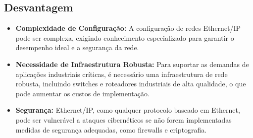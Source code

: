 \documentclass[a4paper,11pt]{article} %
\begin{document}
\subsection{Desvantagem}
\begin{itemize}
    \item \textbf{Complexidade de Configuração:} A configuração de redes Ethernet/IP pode ser complexa, exigindo conhecimento especializado para garantir o desempenho ideal e a segurança da rede.
    \item \textbf{Necessidade de Infraestrutura Robusta:} Para suportar as demandas de aplicações industriais críticas, é necessário uma infraestrutura de rede robusta, incluindo switches e roteadores industriais de alta qualidade, o que pode aumentar os custos de implementação.
    \item \textbf{Segurança:} Ethernet/IP, como qualquer protocolo baseado em Ethernet, pode ser vulnerável a ataques cibernéticos se não forem implementadas medidas de segurança adequadas, como firewalls e criptografia.
\end{itemize}
\end{document}
